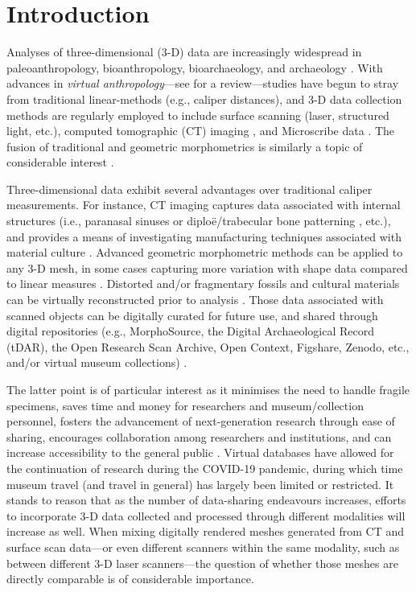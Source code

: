 \documentclass[review]{elsarticle}
\begin{document}
\linenumbers
\section{Introduction}

Analyses of three-dimensional (3-D) data are increasingly widespread in paleoanthropology, bioanthropology, bioarchaeology, and archaeology \citep{RN1746,RN5887,RN303,RN1735,RN5900}. With advances in \textit{virtual anthropology}---see \citet{RN5902} for a review---studies have begun to stray from traditional linear-methods (e.g., caliper distances), and 3-D data collection methods are regularly employed to include surface scanning (laser, structured light, etc.), computed tomographic (CT) imaging \citep{RN11489}, and Microscribe data \citep{RN11487}. The fusion of traditional and geometric morphometrics is similarly a topic of considerable interest \citep{RN11945}.

Three-dimensional data exhibit several advantages over traditional caliper measurements. For instance, CT imaging captures data associated with internal structures (i.e., paranasal sinuses \citep{RN5882,RN11490} or diploë/trabecular bone patterning \citep{RN5885,RN5884}, etc.), and provides a means of investigating manufacturing techniques associated with material culture \citep{RN5891}. Advanced geometric morphometric methods can be applied to any 3-D mesh, in some cases capturing more variation with shape data compared to linear measures \citep{RN5880,RN5888}. Distorted and/or fragmentary fossils and cultural materials can be virtually reconstructed prior to analysis \citep{RN5889,Heid1,RN5903,RN5904,RN8985}. Those data associated with scanned objects can be digitally curated for future use, and shared through digital repositories (e.g., MorphoSource, the Digital Archaeological Record (tDAR), the Open Research Scan Archive, Open Context, Figshare, Zenodo, etc., and/or virtual museum collections) \citep{RN5881,RN5890,RN5587,RN5922,RN11522}.

The latter point is of particular interest as it minimises the need to handle fragile specimens, saves time and money for researchers and museum/collection personnel, fosters the advancement of next-generation research through ease of sharing, encourages collaboration among researchers and institutions, and can increase accessibility to the general public \citep{RN5929,RN5930,RN11508,RN11505,RN726,RN4138,RN5902}. Virtual databases have allowed for the continuation of research during the COVID-19 pandemic, during which time museum travel (and travel in general) has largely been limited or restricted. It stands to reason that as the number of data-sharing endeavours increases, efforts to incorporate 3-D data collected and processed through different modalities will increase as well. When mixing digitally rendered meshes generated from CT and surface scan data---or even different scanners within the same modality, such as between different 3-D laser scanners---the question of whether those meshes are directly comparable is of considerable importance.
\end{document}
